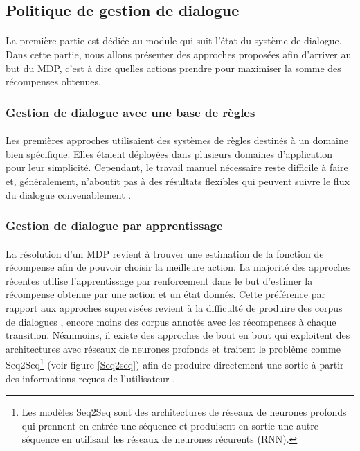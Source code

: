 \subsection{Politique de gestion de dialogue}
\paragraph{}
La première partie est dédiée au module qui suit l'état du système de dialogue. Dans cette partie, nous allons présenter des approches proposées afin d'arriver au but du MDP, c'est à dire quelles actions prendre pour maximiser la somme des récompenses obtenues.
\subsubsection{Gestion de dialogue avec une base de règles}
\paragraph{}
Les premières approches utilisaient des systèmes de règles destinés à un domaine bien spécifique. Elles étaient déployées dans plusieurs domaines d'application pour leur simplicité. Cependant, le travail manuel nécessaire reste difficile à faire et, généralement, n'aboutit pas à des résultats flexibles qui peuvent suivre le flux du dialogue convenablement \citep{Lee2010}.
\subsubsection{Gestion de dialogue par apprentissage}
\paragraph{}
La résolution d'un MDP revient à trouver une estimation de la fonction de récompense afin de pouvoir choisir la meilleure action. La majorité des approches récentes utilise l'apprentissage par renforcement dans le but d'estimer la récompense obtenue par une action et un état donnés. Cette préférence par rapport aux approches supervisées revient à la difficulté de produire des corpus de dialogues \citep{Henderson2008}, encore moins des corpus annotés avec les récompenses à chaque transition. Néanmoins, il existe des approches de bout en bout qui exploitent des architectures avec réseaux de neurones profonds et traitent le problème comme Seq2Seq\footnote{Les modèles Seq2Seq sont des architectures de réseaux de neurones profonds qui prennent en entrée une séquence et produisent en sortie une autre séquence en utilisant les réseaux de neurones récurents (RNN).} (voir figure \ref{Seq2seq}) afin de produire directement une sortie à partir des informations reçues de l'utilisateur \citep{Wen2017,Serban2016}.


